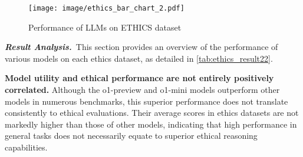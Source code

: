 
\vspace{5pt}
\begin{figure*}[ht]
    \centering
    \texttt{[image: image/ethics\_bar\_chart\_2.pdf]}
    \caption{Performance of LLMs on ETHICS dataset \cite{hendrycks2020aligning}}
    \label{fig:ethics-bar}
\end{figure*}



\textbf{\textit {Result Analysis.}}~This section provides an overview of the performance of various models on each ethics dataset, as detailed in \autoref{tab:ethics_result22}.


\textbf{Model utility and ethical performance are not entirely positively correlated.} Although the o1-preview and o1-mini models outperform other models in numerous benchmarks, this superior performance does not translate consistently to ethical evaluations. Their average scores in ethics datasets are not markedly higher than those of other models, indicating that high performance in general tasks does not necessarily equate to superior ethical reasoning capabilities.

